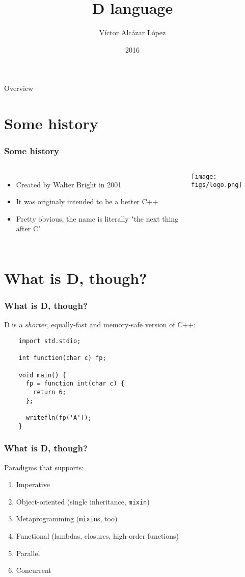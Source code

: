 \documentclass{beamer}
\title{D language}
\author{Víctor Alcázar López}
\institute{Programming Languages course}
\date{2016}
\begin{document}
\frame{\titlepage}

\begin{frame}{Overview}
\tableofcontents
\end{frame}

\section{Some history}
\begin{frame}
  \frametitle{Some history}
  \begin{columns}
    \begin{itemize}
      \item<1-> Created by Walter Bright in 2001
      \item<2-> It was originaly intended to be a better C++
      \item<3-> Pretty obvious, the name is literally "the next thing after C"
    \end{itemize}
    \texttt{[image: figs/logo.png]}
  \end{columns}
\end{frame}

\section{What is D, though?}
\begin{frame}[fragile]
  \frametitle{What is D, though?}
  D is a \emph{shorter}, equally-fast and memory-safe version of C++:

  \begin{verbatim}
    import std.stdio;

    int function(char c) fp;

    void main() {
      fp = function int(char c) {
        return 6;
      };

      writefln(fp('A'));
    }
  \end{verbatim}
\end{frame}

\begin{frame}
  \frametitle{What is D, though?}

  Paradigms that supports:
  \begin{enumerate}
    \item<1-> Imperative
    \item<2-> Object-oriented (single inheritance, \texttt{mixin})
    \item<3-> Metaprogramming (\texttt{mixin}s, too)
    \item<4-> Functional (lambdas, closures, high-order functions)
    \item<5-> Parallel
    \item<6-> Concurrent
  \end{enumerate}

\end{frame}
\end{document}
